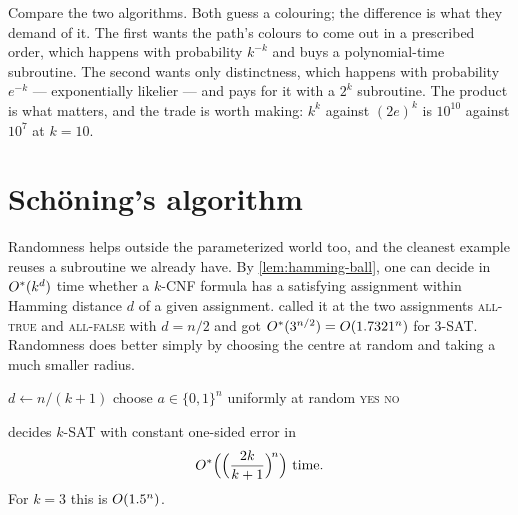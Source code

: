 \begin{intuition}
Compare the two algorithms. Both guess a colouring; the difference is what they
demand of it. The first wants the path's colours to come out in a prescribed
order, which happens with probability $k^{-k}$ and buys a polynomial-time
subroutine. The second wants only distinctness, which happens with probability
$e^{-k}$ --- exponentially likelier --- and pays for it with a $2^k$ subroutine.
The product is what matters, and the trade is worth making: $k^k$ against
$(2e)^k$ is $10^{10}$ against $10^7$ at $k = 10$.
\end{intuition}

\section{Sch\"oning's algorithm}
\label{sec:schoening}

Randomness helps outside the parameterized world too, and the cleanest example
reuses a subroutine we already have. By \cref{lem:hamming-ball}, one can decide
in $O^{*}(k^d)$ time whether a $k$-CNF formula has a satisfying assignment
within Hamming distance $d$ of a given assignment. 
called it at the two assignments \textsc{all-true} and \textsc{all-false} with
$d = n/2$ and got $O^{*}(3^{n/2}) = O\!\left(1.7321^n\right)$ for $3$-SAT. Randomness
does better simply by choosing the centre at random and taking a much smaller
radius.

\begin{algorithm}[ht]
\caption{Sch\"oning's algorithm for $k$-SAT}
\label{alg:schoening}
\begin{algorithmic}[1]
  \State $d \gets n/(k+1)$
    \State choose $a \in \{0,1\}^n$ uniformly at random
     \Return \textsc{yes} \EndIf
  \EndFor
  \State \Return \textsc{no}
\end{algorithmic}
\end{algorithm}

\begin{theorem}\label{thm:schoening}
 decides $k$-SAT with constant one-sided error in
\[ O^{*}\Bigl( \Bigl(\frac{2k}{k+1}\Bigr)^{\!n} \Bigr) \text{ time.} \]
For $k = 3$ this is $O\!\left(1.5^n\right)$.
\end{theorem}

